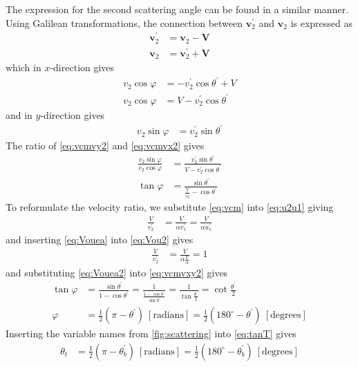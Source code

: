 \documentclass[twoside,english]{uiofysmaster/uiofysmaster}
\let\orgautoref\autoref
\renewcommand{\autoref}
        {%
		 \def\sectionautorefname{Section}%
		 \def\subsectionautorefname{Section}%
		 \def\subsubsectionautorefname{Section}%
		 \def\chapterautorefname{Chapter}%
          \orgautoref}
\begin{document}
\begin{appendices}
The expression for the second scattering angle can be found in a similar manner. 
Using Galilean transformations, the connection between $\boldsymbol{v}_2^{'}$ and $\boldsymbol{v}_2$ is expressed as
\begin{align}\label{eq:vcmv2}
	\boldsymbol{v}_2^{'} &= \boldsymbol{v}_2 - \boldsymbol{V} \nonumber\\
	\boldsymbol{v}_2 &= \boldsymbol{v}_2^{'} + \boldsymbol{V}
\end{align}
which in $x$-direction gives
\begin{align}\label{eq:vcmvx2}
	v_2 \cos \varphi &= -v_2^{'} \cos \theta^{'} + V \nonumber\\
	v_2 \cos \varphi &= V - v_2^{'} \cos \theta^{'}
\end{align}
and in $y$-direction gives
\begin{align}\label{eq:vcmvy2}
	v_2 \sin \varphi &= v_2^{'} \sin \theta^{'}
\end{align}
The ratio of \autoref{eq:vcmvy2} and \autoref{eq:vcmvx2} gives
\begin{align}\label{eq:vcmvxy2}
	\frac{v_2 \sin \varphi}{v_2 \cos \varphi} &= \frac{v_2^{'} \sin \theta^{'}}{V - v_2^{'} \cos \theta^{'}} \nonumber\\
	\tan \varphi &= \frac{\sin \theta^{'}}{\frac{V}{v_2^{'}} - \cos \theta^{'}}
\end{align}
To reformulate the velocity ratio, we substitute \autoref{eq:vcm} into \autoref{eq:u2u1} giving 
\begin{align}\label{eq:Vou2}
	\frac{V}{v_2^{'}} &= \frac{V}{\alpha v_1^{'}} = \frac{V}{\alpha u_1^{'}}
\end{align}
and inserting \autoref{eq:Vouea} into \autoref{eq:Vou2} gives
\begin{align}\label{eq:Vouea2}
	\frac{V}{v_2^{'}} &= \frac{V}{\alpha \frac{V}{\alpha}} = 1
\end{align}
and substituting \autoref{eq:Vouea2} into \autoref{eq:vcmvxy2} gives
\begin{align}\label{eq:tanT}
	\tan \varphi &= \frac{\sin \theta^{'}}{1 - \cos \theta^{'}} = \frac{1}{\frac{1 - \cos \theta^{'}}{\sin \theta^{'}}} = \frac{1}{\tan \frac{\theta^{'}}{2}} = \cot \frac{\theta^{'}}{2} \nonumber\\
	\varphi &= \tfrac{1}{2} (\pi - \theta^{'}) ~[ \text{radians} ] = \tfrac{1}{2} (180^\circ - \theta^{'}) ~[ \text{degrees} ]
\end{align}
Inserting the variable names from \autoref{fig:scattering} into \autoref{eq:tanT} gives
\begin{align}\label{eq:tanTgen}
	\theta_t &= \tfrac{1}{2} (\pi - \theta_b^{'}) ~[ \text{radians} ] = \tfrac{1}{2} (180^\circ - \theta_b^{'}) ~[ \text{degrees} ]
\end{align}



\end{appendices}
\end{document}
